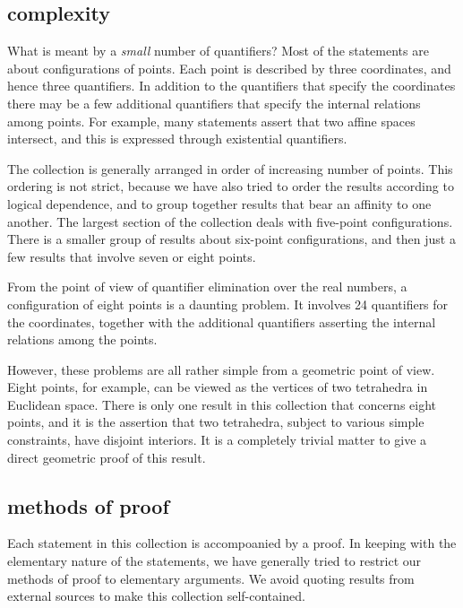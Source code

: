 \subsection{complexity}

What is meant by a {\it small} number of quantifiers?  Most of
the statements are about configurations of points.  Each point
is described by three coordinates, and hence three quantifiers.
In addition to the quantifiers that specify the coordinates there
may be a few additional quantifiers that specify the internal
relations among points.  For example, many statements assert that
two affine spaces intersect, and this is expressed through existential
quantifiers.
  
The collection is generally
arranged in order of increasing number of points.  This ordering
is not strict, because we have also tried to order the results
according to logical dependence, and to group together results 
that bear an affinity to one another.  The largest section of
the collection deals with five-point configurations.  
There is a smaller group of results about six-point configurations,
and then just a few results that involve seven or eight points.

From the point of view of quantifier elimination over the real
numbers, a configuration
of eight points is a daunting problem.  It involves 24 quantifiers
for the coordinates,  together with the additional
quantifiers asserting the internal relations among the points.



However, these problems are all rather simple from a geometric
point of view.  Eight points, for example, can be viewed as the
vertices of two tetrahedra in Euclidean space.    There is only
one result in this collection that concerns eight points, and
it is the assertion that two tetrahedra, subject to various
simple constraints, have disjoint interiors.  It is a completely
trivial
matter to give a direct geometric proof of this result.


\subsection{methods of proof}

Each statement in this collection is accompoanied by a proof.
In keeping with the elementary nature of the statements, 
we have generally tried to restrict our methods of proof to
elementary arguments.  We avoid quoting results from external
sources to make this collection self-contained.

